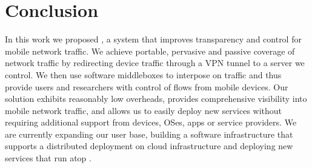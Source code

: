 \section{Conclusion}
\label{sec:conclusion}
In this work we proposed \meddle, a system that improves transparency and 
control for mobile network traffic. We achieve portable, pervasive and passive 
coverage of network traffic by redirecting device traffic through a VPN tunnel 
to a server we control. We then use software middleboxes to interpose on 
traffic and thus provide users and researchers with control of flows from mobile devices. 
Our solution exhibits reasonably low overheads, provides comprehensive 
visibility into mobile network traffic, and allows us to easily deploy new 
services without requiring additional support from devices, OSes, apps or 
service providers. We are currently expanding our user base, building a 
software infrastructure that supports a distributed deployment on cloud 
infrastructure and deploying new services that run atop \meddle.